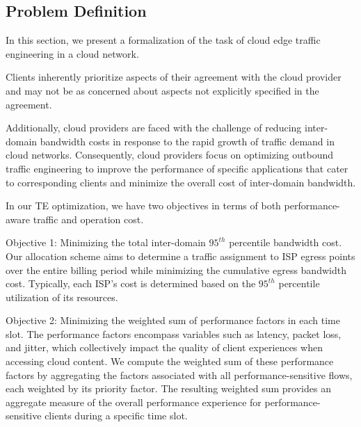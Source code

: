 \subsection{Problem Definition}
In this section, we present a formalization of the task of cloud edge traffic engineering in a cloud network. 

Clients inherently prioritize aspects of their agreement with the cloud provider and may not be as concerned about aspects not explicitly specified in the agreement. 

Additionally, cloud providers are faced with the challenge of reducing inter-domain bandwidth costs in response to the rapid growth of traffic demand in cloud networks. 
Consequently, cloud providers focus on optimizing outbound traffic engineering to improve the performance of specific applications that cater to corresponding clients and minimize the overall cost of inter-domain bandwidth.

In our TE optimization, we have two objectives in terms of both performance-aware traffic and operation cost. 

Objective 1: Minimizing the total inter-domain $95^{th}$ percentile bandwidth cost. Our allocation scheme aims to determine a traffic assignment to ISP egress points over the entire billing period while minimizing the cumulative egress bandwidth cost. Typically, each ISP's cost is determined based on the $95^{th}$ percentile utilization of its resources.

Objective 2: Minimizing the weighted sum of performance factors in each time slot. The performance factors encompass variables such as latency, packet loss, and jitter, which collectively impact the quality of client experiences when accessing cloud content. We compute the weighted sum of these performance factors by aggregating the factors associated with all performance-sensitive flows, each weighted by its priority factor. The resulting weighted sum provides an aggregate measure of the overall performance experience for performance-sensitive clients during a specific time slot.





